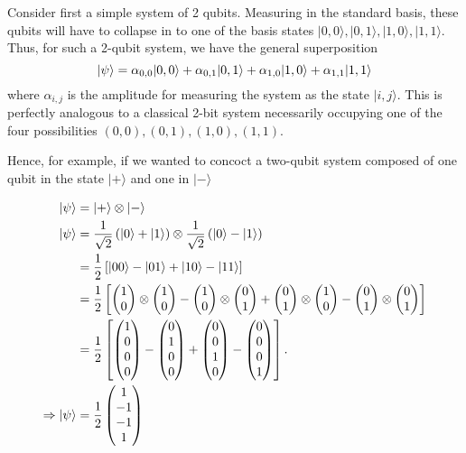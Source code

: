 Consider first a simple system of 2 qubits. Measuring in the standard basis, these qubits will have to collapse in to one of the basis states $|0,0 \rangle, |0,1 \rangle, |1,0\rangle, |1,1\rangle $. Thus, for such a 2-qubit system, we have the general superposition
$$ \ket{\psi} = \alpha_{0,0} |0,0 \rangle + \alpha_{0,1}|0,1 \rangle + \alpha_{1,0} |1,0\rangle +\alpha_{1,1} |1,1\rangle $$ 
where $\alpha_{i,j}$ is the amplitude for measuring the system as the state $|i,j\rangle $. This is perfectly analogous to a classical 2-bit system necessarily occupying one of the four possibilities $ (0,0), (0,1), (1,0), (1,1)$.

Hence, for example, if we wanted to concoct a two-qubit system composed of one qubit in the state $|+\rangle$ and one in $|-\rangle$

\begin{equation}
    \begin{split}
    \ket{\psi} &= |+\rangle \otimes |-\rangle 
    \\ \ket{\psi} &=  \frac{1}{\sqrt{2}} \left( \ket{0} + \ket{1} \right) \otimes  \frac{1}{\sqrt{2}} \left( \ket{0} - \ket{1} \right)
    \\ &= \frac{1}{2} \left[ \ket{00} - \ket{01} + \ket{10} - \ket{11} \right] 
    \\ &= \frac{1}{2} \left[ \left(\begin{matrix}1\\0\end{matrix}\right) \otimes \left(\begin{matrix}1\\0\end{matrix}\right) - \left(\begin{matrix}1\\0\end{matrix}\right) \otimes \left(\begin{matrix}0\\1\end{matrix}\right) + \left(\begin{matrix}0\\1\end{matrix}\right) \otimes \left(\begin{matrix}1\\0\end{matrix}\right) - \left(\begin{matrix}0\\1\end{matrix}\right) \otimes \left(\begin{matrix}0\\1\end{matrix}\right) \right]
    \\ &= \frac{1}{2} \left[ \left(\begin{matrix}1\\0\\0\\0\end{matrix}\right) - \left(\begin{matrix}0\\1\\0\\0\end{matrix}\right) + \left(\begin{matrix}0\\0\\1\\0\end{matrix}\right) - \left(\begin{matrix}0\\0\\0\\1\end{matrix}\right) \right].
    \\ \Rightarrow \ket{\psi} &= \frac{1}{2} \left(\begin{matrix}1\\-1\\-1\\1\end{matrix}\right) 
    \end{split}
\end{equation}

